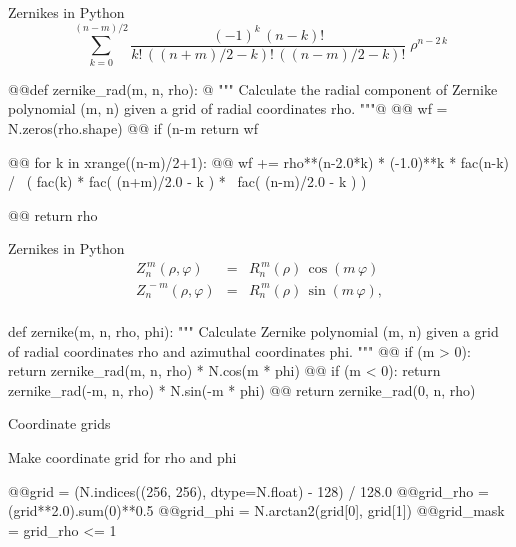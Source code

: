 \documentclass[xetex,10pt]{beamer}
\def\spacer{\vspace*{1em}}
\begin{document}
\begin{frame}[fragile]{Zernikes in Python}
	\[
	\sum_{k=0}^{(n-m)/2} \!\!\! \frac{(-1)^k\,(n-k)!}{k!\,((n+m)/2-k)!\,((n-m)/2-k)!} \;\rho^{n-2\,k}
	\]
\begin{python}
@@def zernike_rad(m, n, rho):
@  """
  Calculate the radial component of Zernike polynomial (m, n)
  given a grid of radial coordinates rho.
  """@
@@  wf = N.zeros(rho.shape)
@@  if (n-m %
    return wf
  
@@  for k in xrange((n-m)/2+1):
@@    wf += rho**(n-2.0*k) * (-1.0)**k * fac(n-k) / \
    	( fac(k) * fac( (n+m)/2.0 - k ) * \
      fac( (n-m)/2.0 - k ) )
  
@@  return rho
\end{python}
\end{frame}

\begin{frame}[fragile]{Zernikes in Python}
	\[
	\begin{array}{lcl}
	Z^{\,m}_n(\rho,\varphi) &=& R^{\,m}_{n}(\rho)\,\cos(m\,\varphi) \! \\
	Z^{\,-\!m}_n(\rho,\varphi) &=& R^{\,m}_{n}(\rho)\,\sin(m\,\varphi), \! \\
  	\end{array}
	\]
\spacer
\begin{python}
def zernike(m, n, rho, phi):
  """
  Calculate Zernike polynomial (m, n) given a grid of radial
  coordinates rho and azimuthal coordinates phi.
  """
@@  if (m > 0): return zernike_rad(m, n, rho) * N.cos(m * phi)
@@  if (m < 0): return zernike_rad(-m, n, rho) * N.sin(-m * phi)
@@  return zernike_rad(0, n, rho)
\end{python}
\end{frame}

\begin{frame}[fragile]{Coordinate grids}

Make coordinate grid for rho and phi
\spacer
\begin{python}
@@grid = (N.indices((256, 256), dtype=N.float) - 128) / 128.0
@@grid_rho = (grid**2.0).sum(0)**0.5
@@grid_phi = N.arctan2(grid[0], grid[1])
@@grid_mask = grid_rho <= 1
\end{python}
\end{frame}
\end{document}
